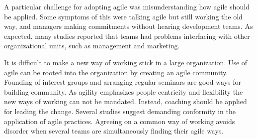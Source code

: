 \documentclass[lnbip]{svmultln}
\begin{document}
A particular challenge for adopting agile was misunderstanding how agile should
be applied. Some symptoms of this were talking agile but still working the old
way, and managers making commitments without hearing development teams.
As expected, many studies reported that teams had problems interfacing with
other organizational units, such as management and marketing.

It is difficult to make a new way of working stick in a large organization.
Use of agile can be rooted into the organization by creating an agile community.
Founding of interest groups and arranging regular seminars are good ways for
building community. As agility emphasizes people centricity and flexibility the
new ways of working can not be mandated. Instead, coaching should be applied for
leading the change. Several studies suggest demanding conformity in the
application of agile practices. Agreeing on a common way of working avoids
disorder when several teams are simultaneously finding their agile ways.
\end{document}
